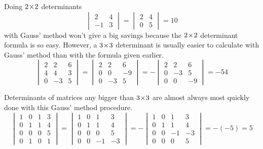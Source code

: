 \begin{example}
Doing \( 2 \! \times \! 2 \) determinants
\begin{equation*}
   \begin{vmatrix}
      2  &4  \\
      -1 &3
   \end{vmatrix}
   =
   \begin{vmatrix}
      2  &4  \\
      0  &5
   \end{vmatrix}
   =10
\end{equation*}
with Gauss' method won't give a big savings
because the $2 \! \times \! 2$ determinant formula is so easy.
However, a \( 3 \! \times \! 3 \) determinant is usually easier to calculate
with Gauss' method than with the formula given earlier.
\begin{equation*}
   \begin{vmatrix}
     2  &2  &6  \\
     4  &4  &3  \\
     0  &-3 &5
   \end{vmatrix}
   =
   \begin{vmatrix}
     2  &2  &6  \\
     0  &0  &-9 \\
     0  &-3 &5
   \end{vmatrix}
   =
   -\begin{vmatrix}
     2  &2  &6  \\
     0  &-3 &5  \\
     0  &0  &-9
   \end{vmatrix}
   =-54
\end{equation*}
\end{example}

\begin{example}
Determinants of matrices any bigger than $3 \! \times \! 3$ are almost always 
most quickly done with this Gauss' method procedure.
\begin{equation*}
   \begin{vmatrix}
      1  &0  &1  &3  \\
      0  &1  &1  &4  \\
      0  &0  &0  &5  \\
      0  &1  &0  &1
   \end{vmatrix}
   =
   \begin{vmatrix}
      1  &0  &1  &3  \\
      0  &1  &1  &4  \\
      0  &0  &0  &5  \\
      0  &0  &-1 &-3
   \end{vmatrix}
   =
   -\begin{vmatrix}
      1  &0  &1  &3  \\
      0  &1  &1  &4  \\
      0  &0  &-1 &-3 \\
      0  &0  &0  &5
   \end{vmatrix}
   =-(-5)=5
\end{equation*}
\end{example}

